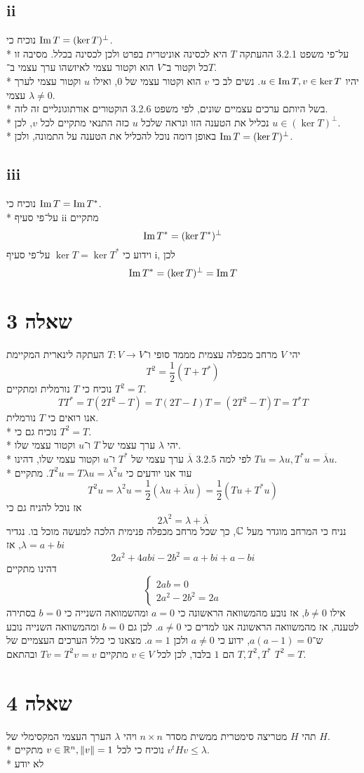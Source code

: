 \subsection{ii}
נוכיח כי $\operatorname{Im} T = (\ker T)^\perp$. \\*
על־פי משפט 3.2.1 ההעתקה $T$ היא לכסינה אוניטרית בפרט ולכן לכסינה בכלל.
מסיבה זו כל וקטור ב־$V$ הוא וקטור עצמי לאיזשהו ערך עצמי ב־$T$. \\*
יהיו $u \in \operatorname{Im} T, v \in \ker T$. נשים לב כי $v$ הוא וקטור עצמי של $0$, ואילו $u$ וקטור עצמי לערך עצמי $\lambda \ne 0$. \\*
בשל היותם ערכים עצמיים שונים, לפי משפט 3.2.6 הוקטורים אורתוגונליים זה לזה. \\*
נכליל את הטענה הזו ונראה שלכל $u$ כזה התנאי מתקיים לכל $v$, לכן $u \in (\ker T)^\perp$. \\*
באופן דומה נוכל להכליל את הטענה על התמונה, ולכן $\operatorname{Im} T = (\ker T)^\perp$.

\subsection{iii}
נוכיח כי $\operatorname{Im} T = \operatorname{Im} T^*$. \\*
על־פי סעיף ii מתקיים
\[
	\operatorname{Im} T^* = (\ker T^*)^\perp
\]
וידוע כי $\ker T = \ker T^*$ על־פי סעיף i, לכן
\[
	\operatorname{Im} T^* = (\ker T)^\perp = \operatorname{Im} T
\]

\section{שאלה 3}
יהי $V$ מרחב מכפלה עצמית מממד סופי ו־$T: V \to V$ העתקה לינארית המקיימת
\[
	T^2 = \frac{1}{2}(T + T^*)
\]
נוכיח כי $T$ נורמלית ומתקיים $T^2 = T$.
\[
	T T^* = T (2T^2 - T) = T (2T - I) T = (2T^2 - T) T = T^* T
\]
אנו רואים כי $T$ נורמלית. \\*
נוכיח גם כי $T^2 = T$. \\*
יהי $\lambda$ ערך עצמי של $T$ ו־$u$ וקטור עצמי שלו. \\*
לפי למה 3.2.5 $\overline{\lambda}$ ערך עצמי של $T^*$ ו־$u$ וקטור עצמי שלו,
דהינו $T u = \lambda u, T^* u = \overline{\lambda} u$. \\*
עוד אנו יודעים כי $T^2 u = T \lambda u = \lambda^2 u$. מתקיים
\[
	T^2 u = \lambda^2 u = \frac{1}{2}(\lambda u + \overline{\lambda} u) = \frac{1}{2}(T u + T^* u)
\]
אז נוכל להניח גם כי
\[
	2 \lambda^2 = \lambda + \overline{\lambda}
\]
נניח כי המרחב מוגדר מעל $\mathbb{C}$, כך שכל מרחב מכפלה פנימית הלכה למעשה מוכל בו.
נגדיר $\lambda = a + bi$, אז
\[
	2a^2 + 4abi - 2b^2 = a + bi + a - bi
\]
דהינו מתקיים
\[
	\begin{cases}
		2ab = 0 \\
		2a^2 - 2b^2 = 2a
	\end{cases}
\]
אילו $b \ne 0$, אז נובע מהמשוואה הראשונה כי $a = 0$ ומהשמוואה השנייה כי $b = 0$ בסתירה לטענה, אז מהמשוואה הראשונה אנו למדים כי $a \ne 0$.
לכן גם $b = 0$ ומהמשוואה השנייה נובע ש־$a(a - 1) = 0$, ידוע כי $a \ne 0$ ולכן $a = 1$.
מצאנו כי כלל הערכים העצמיים של $T, T^2, T^*$ הם $1$ בלבד, לכן לכל $v \in V$ מתקיים $T v = T^2 v = v$ ובהתאם $T^2 = T$.

\section{שאלה 4}
תהי $H$ מטריצה סימטרית ממשית מסדר $n \times n$ ויהי $\lambda$ הערך העצמי המקסימלי של $H$. \\*
נוכיח כי לכל $v \in \mathbb{R}^n, \lVert v \rVert = 1$ מתקיים $v^t H v \le \lambda$. \\*
לא יודע


